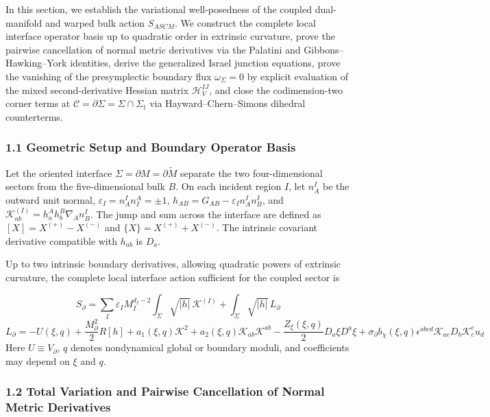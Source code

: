 \documentclass[aps,prd,onecolumn,superscriptaddress,nofootinbib,longbibliography,10pt]{revtex4-2}
\begin{document}
{{  In this section, we establish the variational well-posedness of the coupled dual-manifold and warped bulk action \(S_{ASCM}\). We construct the complete local interface operator basis up to quadratic order in extrinsic curvature, prove the pairwise cancellation of normal metric derivatives via the Palatini and Gibbons–Hawking–York identities, derive the generalized Israel junction equations, prove the vanishing of the presymplectic boundary flux \(\omega_\Sigma = 0\) by explicit evaluation of the mixed second-derivative Hessian matrix \(\mathcal{H}_V^{IJ}\), and close the codimension-two corner terms at \(\mathcal{C} = \partial\Sigma = \Sigma \cap \Sigma_t\) via Hayward–Chern–Simons dihedral counterterms.


  
  
\subsubsection*{1.1 Geometric Setup and Boundary Operator Basis}

  Let the oriented interface \(\Sigma = \partial M = \partial\tilde{M}\) separate the two four-dimensional sectors from the five-dimensional bulk \(B\). On each incident region \(I\), let \(n^I_A\) be the outward unit normal, \(\varepsilon_I = n^I_A n_I^A = \pm 1\), \(h_{AB} = G_{AB} - \varepsilon_I n^I_A n^I_B\), and \(\mathcal{K}^{(I)}_{ab} = h^A_a h^B_b \nabla_A n^I_B\). The jump and sum across the interface are defined as \([X] = X^{(+)} - X^{(-)}\) and \(\{X\} = X^{(+)} + X^{(-)}\). The intrinsic covariant derivative compatible with \(h_{ab}\) is \(D_a\).


  Up to two intrinsic boundary derivatives, allowing quadratic powers of extrinsic curvature, the complete local interface action sufficient for the coupled sector is


  \[ S_\partial = \sum_I \varepsilon_I M_I^{d_I - 2} \int_\Sigma \sqrt{|h|}\, \mathcal{K}^{(I)} + \int_\Sigma \sqrt{|h|}\, L_\partial \]
  \[ L_\partial = -U(\xi, q) + \frac{M_\partial^2}{2}R[h] + a_1(\xi, q)\mathcal{K}^2 + a_2(\xi, q)\mathcal{K}_{ab}\mathcal{K}^{ab} - \frac{Z_\xi(\xi, q)}{2}D_a\xi D^a\xi + \sigma_\partial b_\chi(\xi, q)\epsilon^{abcd}\mathcal{K}_{ae} D_b \mathcal{K}^e_c u_d \]
  Here \(U \equiv V_\partial\), \(q\) denotes nondynamical global or boundary moduli, and coefficients may depend on \(\xi\) and \(q\).



  
\subsubsection*{1.2 Total Variation and Pairwise Cancellation of Normal Metric Derivatives}

}}
\end{document}
